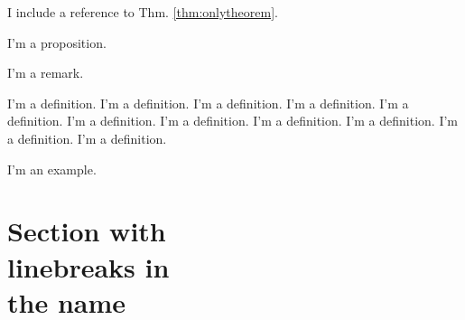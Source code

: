 \begin{corollary}
I include a reference to Thm. \ref{thm:onlytheorem}.
\end{corollary}

\begin{proposition}
I'm a proposition.
\end{proposition}

\begin{remark}
I'm a remark. 
\end{remark}

\begin{definition}
I'm a definition. I'm a definition. I'm a definition. I'm a definition. I'm a definition. I'm a definition. I'm a definition. I'm a definition. I'm a definition. I'm a definition. I'm a definition. 
\end{definition}

\begin{example}
I'm an example.
\end{example}


\section[Optional table of contents heading]{Section with\\ linebreaks in\\the
name}


\Blindtext[2]




